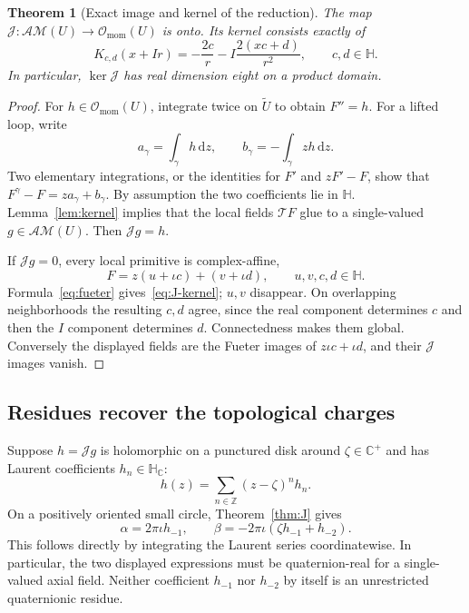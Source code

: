 \documentclass[11pt,a4paper]{article}
\numberwithin{equation}{section}
\newtheorem{theorem}{Theorem}[section]
\theoremstyle{definition}
\theoremstyle{remark}
\newcommand{\C}{\mathbb C}
\newcommand{\HH}{\mathbb H}
\newcommand{\HC}{\mathbb H_{\C}}
\newcommand{\AM}{\mathcal{AM}}
\newcommand{\Hol}{\mathcal O}
\newcommand{\T}{\mathcal T}
\newcommand{\J}{\mathcal J}
\newcommand{\dz}{\,\mathrm dz}
\begin{document}
\begin{theorem}[Exact image and kernel of the reduction]\label{thm:J-image}
The map $\J:\AM(U)\to\Hol_{\mathrm{mom}}(U)$ is onto. Its kernel consists
exactly of
\begin{equation}
 K_{c,d}(x+Ir)=-\frac{2c}{r}-I\frac{2(xc+d)}{r^2},
 \qquad c,d\in\HH.
 \label{eq:J-kernel}
\end{equation}
In particular, $\ker\J$ has real dimension eight on a product domain.
\end{theorem}
\begin{proof}
For $h\in\Hol_{\mathrm{mom}}(U)$, integrate twice on $\widetilde U$ to
obtain $F''=h$. For a lifted loop, write
\[
 a_\gamma=\int_\gamma h\dz,\qquad
 b_\gamma=-\int_\gamma zh\dz.
\]
Two elementary integrations, or the identities for $F'$ and $zF'-F$,
show that $F^\gamma-F=za_\gamma+b_\gamma$. By assumption the two
coefficients lie in $\HH$. Lemma~\ref{lem:kernel} implies that the local
fields $\T F$ glue to a single-valued $g\in\AM(U)$. Then $\J g=h$.

If $\J g=0$, every local primitive is complex-affine,
\[
 F=z(u+\iota c)+(v+\iota d),\qquad u,v,c,d\in\HH.
\]
Formula~\eqref{eq:fueter} gives~\eqref{eq:J-kernel}; $u,v$ disappear.
On overlapping neighborhoods the resulting $c,d$ agree, since the real
component determines $c$ and then the $I$ component determines $d$.
Connectedness makes them global. Conversely the displayed fields are the
Fueter images of $z\iota c+\iota d$, and their $\J$ images vanish.
\end{proof}

\subsection{Residues recover the topological charges}
Suppose $h=\J g$ is holomorphic on a punctured disk around
$\zeta\in\C^+$ and has Laurent coefficients $h_n\in\HC$:
\[
 h(z)=\sum_{n\in\mathbb Z}(z-\zeta)^n h_n.
\]
On a positively oriented small circle, Theorem~\ref{thm:J} gives
\begin{equation}
 \boxed{\alpha=2\pi\iota h_{-1},\qquad
 \beta=-2\pi\iota(\zeta h_{-1}+h_{-2}).}
 \label{eq:residue-charges}
\end{equation}
This follows directly by integrating the Laurent series coordinatewise.
In particular, the two displayed expressions must be quaternion-real
for a single-valued axial field. Neither coefficient $h_{-1}$ nor
$h_{-2}$ by itself is an unrestricted quaternionic residue.
\end{document}
